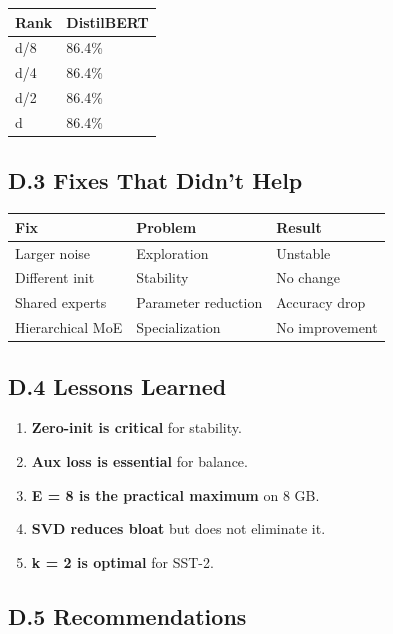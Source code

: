 \begin{table}[H]
\centering
\small
\begin{tabular}{ll}
\toprule
\textbf{Rank} & \textbf{DistilBERT} \\
\midrule
d/8 & 86.4\% \\
d/4 & 86.4\% \\
d/2 & 86.4\% \\
d & 86.4\% \\
\bottomrule
\end{tabular}
\end{table}

\subsection{D.3 Fixes That Didn't Help}

\begin{table}[H]
\centering
\small
\begin{tabular}{lll}
\toprule
\textbf{Fix} & \textbf{Problem} & \textbf{Result} \\
\midrule
Larger noise & Exploration & Unstable \\
Different init & Stability & No change \\
Shared experts & Parameter reduction & Accuracy drop \\
Hierarchical MoE & Specialization & No improvement \\
\bottomrule
\end{tabular}
\end{table}

\subsection{D.4 Lessons Learned}

\begin{enumerate}
\item \textbf{Zero-init is critical} for stability.
\item \textbf{Aux loss is essential} for balance.
\item \textbf{E = 8 is the practical maximum} on 8 GB.
\item \textbf{SVD reduces bloat} but does not eliminate it.
\item \textbf{k = 2 is optimal} for SST-2.

\end{enumerate}
\subsection{D.5 Recommendations}


